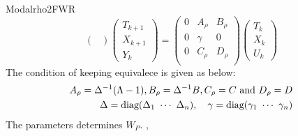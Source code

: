 \begin{command}{Modalrho2FWR}
\begin{equation}
\begin{pmatrix}
\end{pmatrix}
\begin{pmatrix}
T_{k+1} \\
X_{k+1} \\
Y_{k}
\end{pmatrix}
=
\begin{pmatrix}
0 & A_{\rho} & B_{\rho} \\
0 & \gamma & 0 \\
0 & C_{\rho} & D_{\rho} \\
\end{pmatrix}
\begin{pmatrix}
T_{k} \\
X_{k} \\
U_{k}
\end{pmatrix}
\end{equation}
The condition of keeping equivalece is given as below:
\begin{eqnarray}
\label{eq:Modalrho2FWR:rho_state}A_{\rho}=\Delta^{-1}(\Lambda-1), B_{\rho}=\Delta^{-1}B, C_{\rho}=C~\hbox{and}~D_{\rho}=D\\
\label{eq:Modalrho2FWR:Delta_gamma}\Delta=\hbox{diag}(\Delta_{1}~\cdots~\Delta_{n}),\quad\gamma=\hbox{diag}(\gamma_{1}~\cdots~\gamma_{n})
\end{eqnarray}
The  parameters determines $W_P$.
, 
\end{command}



